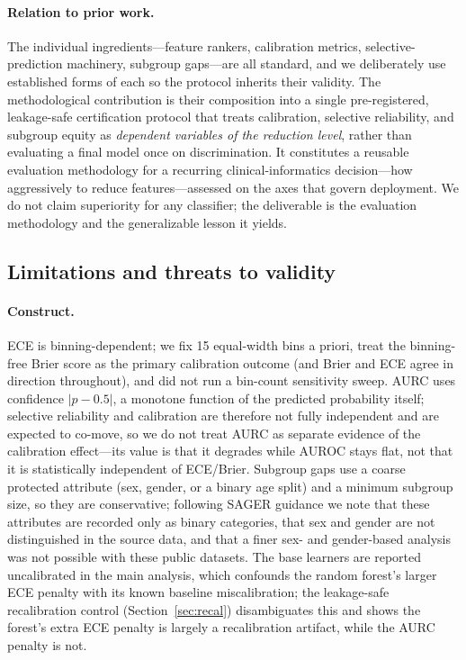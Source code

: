 \documentclass[fleqn,10pt]{wlscirep}
\begin{document}
\paragraph{Relation to prior work.} The individual ingredients---feature rankers, calibration
metrics, selective-prediction machinery, subgroup gaps---are all standard, and we deliberately use
established forms of each so the protocol inherits their validity. The methodological contribution is
their composition into a single pre-registered, leakage-safe certification protocol that treats
calibration, selective reliability, and subgroup equity as \emph{dependent variables of the reduction
level}, rather than evaluating a final model once on discrimination. It constitutes a reusable
evaluation methodology for a recurring clinical-informatics decision---how aggressively to reduce
features---assessed on the axes that govern deployment. We do not claim superiority for any
classifier; the deliverable is the evaluation methodology and the generalizable lesson it yields.

\subsection{Limitations and threats to validity}
\label{sec:threats}

\paragraph{Construct.} ECE is binning-dependent; we fix 15 equal-width bins a priori, treat the
binning-free Brier score as the primary calibration outcome (and Brier and ECE agree in
direction throughout), and did not run a bin-count sensitivity sweep. AURC uses confidence
$|p-0.5|$, a monotone function of the predicted probability itself; selective reliability and
calibration are therefore not fully independent and are expected to co-move, so we do not treat
AURC as separate evidence of the calibration effect---its value is that it degrades while AUROC
stays flat, not that it is statistically independent of ECE/Brier. Subgroup gaps use a coarse
protected attribute (sex, gender, or a binary age split) and a minimum subgroup size, so they
are conservative; following SAGER guidance we note that these attributes are recorded only as
binary categories, that sex and gender are not distinguished in the source data, and that a finer
sex- and gender-based analysis was not possible with these public datasets. The base learners are reported uncalibrated in the main analysis, which confounds
the random forest's larger ECE penalty with its known baseline miscalibration; the leakage-safe
recalibration control (Section~\ref{sec:recal}) disambiguates this and shows the forest's extra ECE
penalty is largely a recalibration artifact, while the AURC penalty is not.
\end{document}
